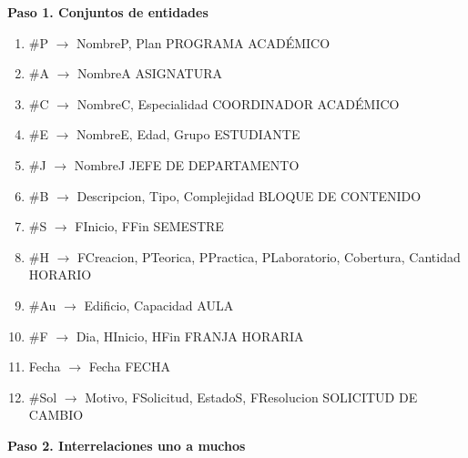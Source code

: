 \textbf{Paso 1. Conjuntos de entidades}
\begin{enumerate}[label=f\arabic*,start=1,leftmargin=3em]
  \item \#P \ensuremath{\to} NombreP, Plan \hfill {\small\color{gris}PROGRAMA ACADÉMICO}
  \item \#A \ensuremath{\to} NombreA \hfill {\small\color{gris}ASIGNATURA}
  \item \#C \ensuremath{\to} NombreC, Especialidad \hfill {\small\color{gris}COORDINADOR ACADÉMICO}
  \item \#E \ensuremath{\to} NombreE, Edad, Grupo \hfill {\small\color{gris}ESTUDIANTE}
  \item \#J \ensuremath{\to} NombreJ \hfill {\small\color{gris}JEFE DE DEPARTAMENTO}
  \item \#B \ensuremath{\to} Descripcion, Tipo, Complejidad \hfill {\small\color{gris}BLOQUE DE CONTENIDO}
  \item \#S \ensuremath{\to} FInicio, FFin \hfill {\small\color{gris}SEMESTRE}
  \item \#H \ensuremath{\to} FCreacion, PTeorica, PPractica, PLaboratorio, Cobertura, Cantidad \hfill {\small\color{gris}HORARIO}
  \item \#Au \ensuremath{\to} Edificio, Capacidad \hfill {\small\color{gris}AULA}
  \item \#F \ensuremath{\to} Dia, HInicio, HFin \hfill {\small\color{gris}FRANJA HORARIA}
  \item Fecha \ensuremath{\to} Fecha \hfill {\small\color{gris}FECHA}
  \item \#Sol \ensuremath{\to} Motivo, FSolicitud, EstadoS, FResolucion \hfill {\small\color{gris}SOLICITUD DE CAMBIO}
\end{enumerate}
\textbf{Paso 2. Interrelaciones uno a muchos}
